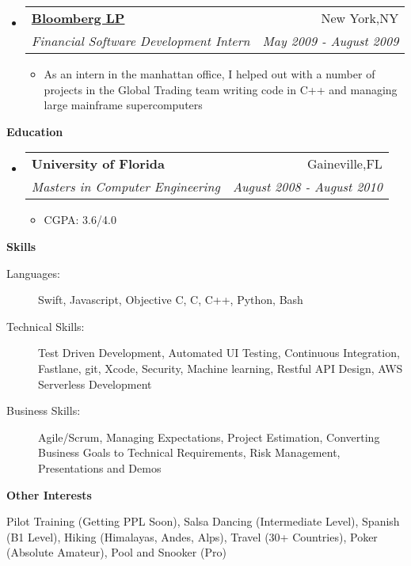\documentclass[letterpaper,11pt]{article}
\makeatletter
\newcommand{\resitem}[1]{\item #1 \vspace{-2pt}}
\newcommand{\resheading}[1]{{\large \colorbox{mygrey}{\begin{minipage}{\textwidth}{\textbf{#1 \vphantom{p\^{E}}}}\end{minipage}}}}
\newcommand{\ressubheading}[4]{
\begin{tabular*}{7.0in}{l@{\extracolsep{\fill}}r}
    \textbf{#1} & #2 \\
    \textit{#3} & \textit{#4} \\
\end{tabular*}\vspace{-6pt}}
\makeatother
\begin{document}
\begin{itemize}
\item
    \ressubheading{\href{http://www.bloomberg.com}{Bloomberg LP}}{New York,NY}{Financial Software Development Intern}{May 2009 - August 2009}
    \begin{itemize}
      \resitem{As an intern in the manhattan office, I helped out with a number of projects in the Global Trading team writing code in C++ and managing large mainframe supercomputers}
    \end{itemize}
    
    
\end{itemize}

\vspace{0.3in}
  
\resheading{Education}
\begin{itemize}
\item
    \ressubheading{University of Florida}{Gaineville,FL}{{Masters in Computer Engineering}}{August 2008 - August 2010}
    \begin{itemize}
        \resitem{CGPA: 3.6/4.0}
    \end{itemize}
\end{itemize}

\vspace{0.3in}

\resheading{Skills}
\begin{description}
\item[Languages:]
Swift, Javascript, Objective C, C, C++, Python, Bash
\item[Technical Skills:] Test Driven Development, Automated UI Testing, Continuous Integration, Fastlane, git, Xcode, Security,
Machine learning, Restful API Design, AWS Serverless Development
\item[Business Skills:]
Agile/Scrum, Managing Expectations, Project Estimation, Converting Business Goals to Technical Requirements, Risk Management, Presentations and Demos
\end{description}

\vspace{0.2in}

\resheading{Other Interests}
\begin{description}
\item Pilot Training (Getting PPL Soon), Salsa Dancing (Intermediate Level), Spanish (B1 Level), Hiking (Himalayas, Andes, Alps), Travel (30+ Countries),  Poker (Absolute Amateur), Pool and Snooker (Pro)
\end{description}
\end{document}
